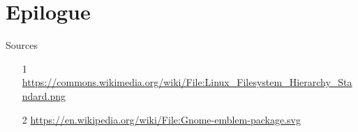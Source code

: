     \section{Epilogue}

    \begin{frame}[t,fragile]{Sources}
        \footnotesize
        \begin{itemize}
            \item[1] \url{https://commons.wikimedia.org/wiki/File:Linux_Filesystem_Hierarchy_Standard.png}
            \item[2] \url{https://en.wikipedia.org/wiki/File:Gnome-emblem-package.svg}
        \end{itemize}
    \end{frame}



